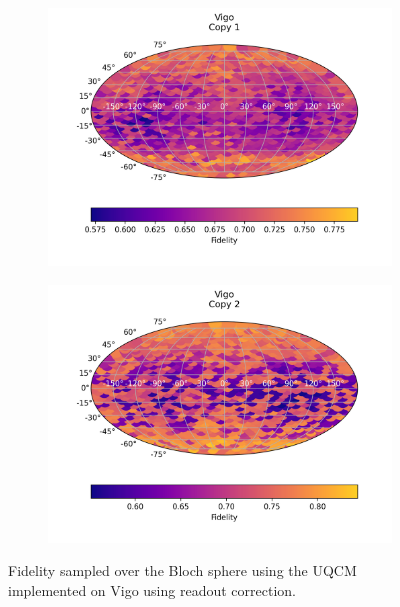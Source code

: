 \begin{figure}[H]
    \centering
    \begin{subfigure}{.5\textwidth}
      \centering
      \includegraphics[width=\textwidth]{Figures/UQCM/IBM/FullSphere/results_corrected_vigo_copy1.png}
    \end{subfigure}%
    \begin{subfigure}{.5\textwidth}
      \centering
      \includegraphics[width=\textwidth]{Figures/UQCM/IBM/FullSphere/results_corrected_vigo_copy2.png}
    \end{subfigure}
    \caption{Fidelity sampled over the Bloch sphere using the UQCM implemented on Vigo using readout correction.}
    \label{fig:uqcm_vigo}
\end{figure}

